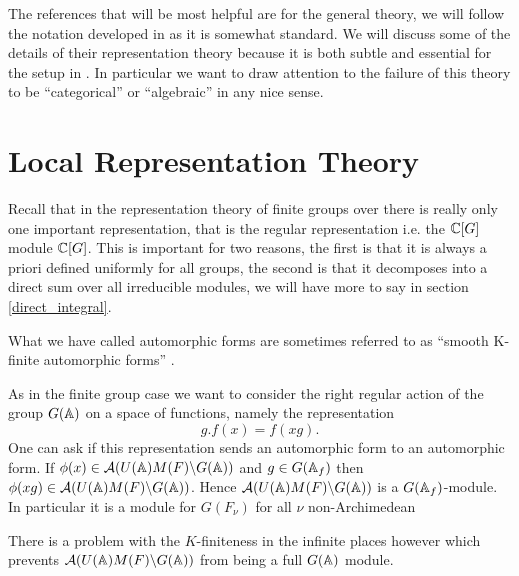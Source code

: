 The references that will be most helpful are \cite[I.II]{borelAutomorphicFormsRepresentations1979}\cite{getzIntroductionAutomorphicRepresentations2024} for the general theory, we will follow the notation developed in \cite{moeglinSpectralDecompositionEisenstein1995} as it is somewhat standard. We will discuss some of the details of their representation theory because it is both subtle and essential for the setup in \cite{jiangPolesCertainResidual2013}. In particular we want to draw attention to the failure of this theory to be ``categorical'' or ``algebraic'' in any nice sense. 
\section{Local Representation Theory}
Recall that in the representation theory of finite groups over \C there is really only one important representation, that is the regular representation i.e. the \(\C[G]\) module \(\C[G]\). This is important for two reasons, the first is that it is always a priori defined uniformly for all groups, the second is that it decomposes into a direct sum over all irreducible modules, we will have more to say in section \ref{direct_integral}.

\begin{remark}
    What we have called automorphic forms are sometimes referred to as ``smooth K-finite automorphic forms'' \cite[2.2]{cogdellLecturesLfunctionsConverse}.
\end{remark}

As in the finite group case we want to consider the right regular action of the group \(G(\A)\) on a space of functions, namely the representation 
\[g.f(x) = f(xg).\]
One can ask if this representation sends an automorphic form to an automorphic form.
If \(\phi(x)\in \mathcal{A}(U(\A)M(F)\backslash G(\A))\) and \(g\in G(\A_f)\) then \(\phi(xg) \in \mathcal{A}(U(\A)M(F)\backslash G(\A)) \). Hence \(\mathcal{A}(U(\A)M(F)\backslash G(\A))\) is a \(G(\A_f)\)-module. In particular it is a module for \(G(F_\nu)\) for all \(\nu\) non-Archimedean

There is a problem with the \(K\)-finiteness in the infinite places however which prevents \( \mathcal{A}(U(\A)M(F)\backslash G(\A))\) from being a full \(G(\A)\) module.


